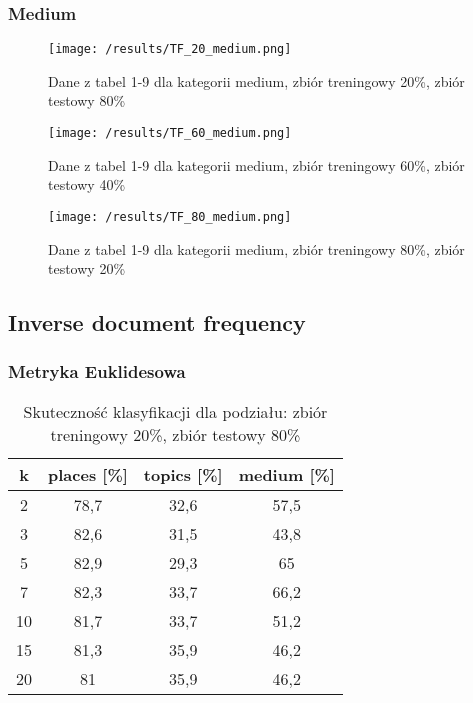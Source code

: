 \documentclass{classrep}
\begin{document}
\subsubsection{Medium}
\begin{figure}[H]
	\centering
	\texttt{[image: /results/TF\_20\_medium.png]}
	\caption{Dane z tabel 1-9 dla kategorii medium, zbiór treningowy 20\%, zbiór testowy 80\%}
\end{figure}
\begin{figure}[H]
	\centering
	\texttt{[image: /results/TF\_60\_medium.png]}
	\caption{Dane z tabel 1-9 dla kategorii medium, zbiór treningowy 60\%, zbiór testowy 40\%}
\end{figure}
\begin{figure}[H]
	\centering
	\texttt{[image: /results/TF\_80\_medium.png]}
	\caption{Dane z tabel 1-9 dla kategorii medium, zbiór treningowy 80\%, zbiór testowy 20\%}
\end{figure}

\subsection{Inverse document frequency}

\subsubsection{Metryka Euklidesowa}
\begin{table}[H]
	\centering
	\begin{tabular}{c c c c} 
		\hline
		\textbf{k} & \textbf{places [\%]} & \textbf{topics [\%]} &  \textbf{medium [\%]} \\ [0.5ex] 
		\hline
		\hline 
2 & 78,7 & 32,6 & 57,5 \\ 
3 & 82,6 & 31,5 & 43,8 \\ 
5 & 82,9 & 29,3 & 65 \\ 
7 & 82,3 & 33,7 & 66,2 \\ 
10 & 81,7 & 33,7 & 51,2 \\ 
15 & 81,3 & 35,9 & 46,2 \\ 
20 & 81 & 35,9 & 46,2 \\ 
		\hline
	\end{tabular}
	\caption{Skuteczność klasyfikacji dla podziału: zbiór treningowy 20\%, zbiór testowy 80\%}
\end{table}
\end{document}
